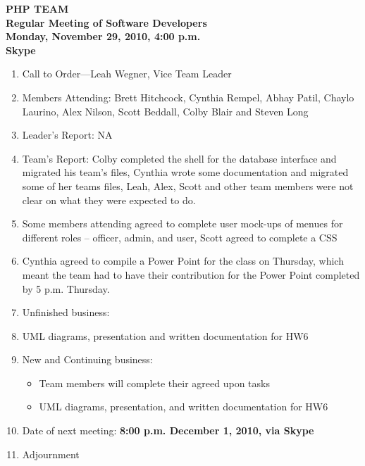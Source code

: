 \documentclass[12pt, oneside, letterpaper]{article}
\begin{document}
\begin{center}
\textbf{
PHP TEAM \\
Regular Meeting of Software Developers \\
Monday, November 29, 2010, 4:00 p.m. \\
Skype \\
}
\end{center}
\begin{enumerate}
\rightmargin=0pt
\item{Call to Order---Leah Wegner, Vice Team Leader}
\item{Members Attending: Brett Hitchcock, Cynthia Rempel, Abhay Patil, Chaylo Laurino, Alex Nilson, Scott Beddall, Colby Blair and Steven Long}
\item{Leader's Report: NA}
\item{Team's Report: Colby completed the shell for the database interface and migrated his team's files,
		Cynthia wrote some documentation and migrated some of her teams files, Leah, Alex, Scott and other team members were not clear on
		what they were expected to do.}
\item{Some members attending agreed to complete user mock-ups of menues
for different roles -- officer, admin, and user, Scott agreed to complete a CSS}
\item{Cynthia agreed to compile a Power Point for the class on Thursday, which meant the team had to have their contribution for the
Power Point completed by 5 p.m. Thursday.}
\item{Unfinished business:}
\item UML diagrams, presentation and written documentation for HW6
\item{New and Continuing business:}
\begin{itemize}
\item Team members will complete their agreed upon tasks
\item UML diagrams, presentation, and written documentation for HW6
\end{itemize}
\item{Date of next meeting: \textbf{8:00 p.m. December 1, 2010, via Skype}}
\item{Adjournment}
\end{enumerate}
\end{document}
